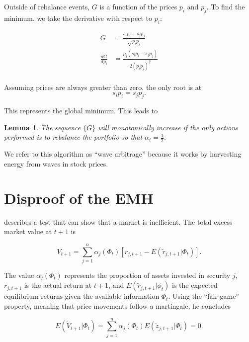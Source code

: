 \documentclass[10pt]{article}
\newtheorem{lemma}{Lemma}
\begin{document}
\begin{multicols}{2}
Outside of rebalance events, $G$ is a function of the prices $p_i$ and $p_j$.
To find the minimum, we take the derivative with respect to $p_i$:

\begin{equation}
\begin{aligned}
\label{def:G}
  G &= \frac{s_i p_i + s_j p_j}{\sqrt{p_i p_j}} \\
  \frac{dG}{dp_i} &= \frac{p_j (s_i p_i - s_j p_j)}{2 (p_i p_j)^{\frac{3}{2}}} \\
\end{aligned}
\end{equation}

Assuming prices are always greater than zero, the only root is at
\begin{equation}
\label{eq:balance}
  s_i p_i = s_j p_j .
\end{equation}

This represents the global minimum. This leads to

\begin{lemma}
\label{lemma}
  The sequence $\{G\}$ will monotonically increase if the only actions performed
  is to rebalance the portfolio so that $\alpha_i = \frac{1}{2}$.
\end{lemma}

We refer to this algorithm as ``wave arbitrage'' because it works by harvesting
energy from waves in stock prices.

\section{Disproof of the EMH}
\label{sec:disproof}

\citet{fama1970} describes a test that can show that a market is inefficient.
The total excess market value at $t+1$ is

\begin{equation}
  V_{t+1}
    = \sum_{j=1}^n \alpha_j (\Phi_t) [ r_{j,t+1} - E(\tilde{r}_{j,t+1} | \Phi_t)].
\end{equation}

The value $\alpha_j (\Phi_t)$ represents the proportion of assets invested in
security $j$, $r_{j,t+1}$ is the actual return at $t+1$, and
$E(\tilde{r}_{j,t+1} | \phi_t)$ is the expected equilibrium returns given the
available information $\Phi_t$. Using the ``fair game'' property, meaning that
price movements follow a martingale, he concludes

\begin{equation}
\label{eq:excess_returns}
  E(\tilde{V}_{t+1} | \Phi_t)
    = \sum_{j=1}^n \alpha_j (\Phi_t) E(\tilde{z}_{j,t+1} | \Phi_t)
    = 0.
\end{equation}


\end{multicols}
\end{document}

